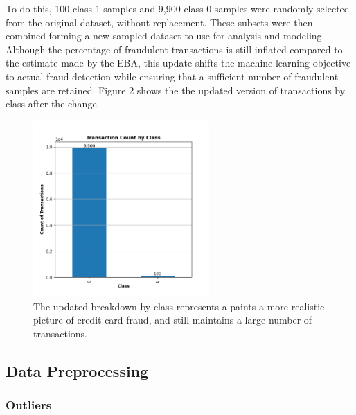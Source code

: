 \documentclass[11pt, oneside]{article}   	%
\begin{document}
To do this, 100 class 1 samples and 9,900 class 0 samples were randomly selected from the original dataset, without replacement. These subsets were then combined forming a new sampled dataset to use for analysis and modeling. Although the percentage of fraudulent transactions is still inflated compared to the estimate made by the EBA, this update shifts the machine learning objective to actual fraud detection while ensuring that a sufficient number of fraudulent samples are retained. Figure 2 shows the the updated version of transactions by class after the change.\\

\begin{figure}[h!]
    \centering
    \includegraphics[width=0.6\textwidth]{figures/fig_2.png}
    \captionsetup{font=small} 
    \caption{The updated breakdown by class represents a paints a more realistic picture of credit card fraud, and still maintains a large number of transactions.}
    \label{fig2}
\end{figure}




\subsection{Data Preprocessing}




\subsubsection{Outliers}
\end{document}
